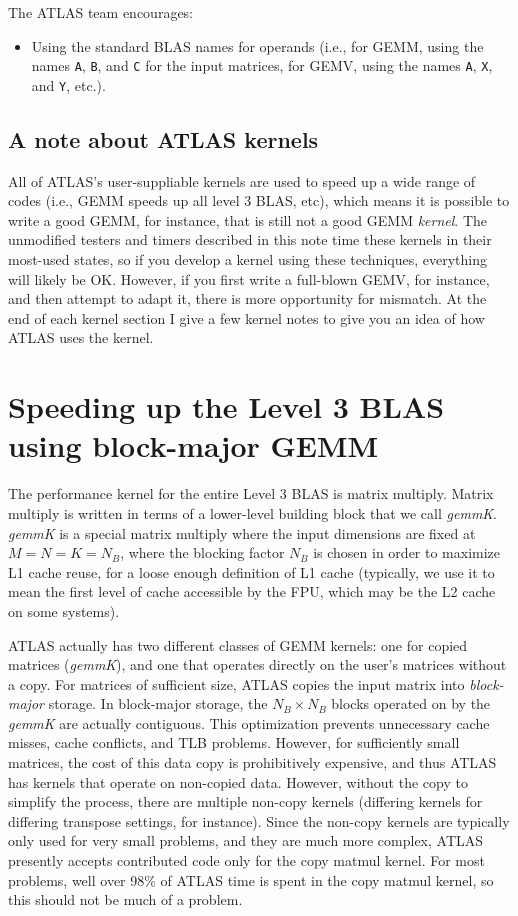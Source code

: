 \documentclass[11pt]{article}
\begin{document}
The ATLAS team encourages:
\begin{itemize}
\item Using the standard BLAS names for operands (i.e., for GEMM, using
the names {\tt A}, {\tt B}, and {\tt C} for the input matrices, for
GEMV, using the names {\tt A}, {\tt X}, and {\tt Y}, etc.).
\end{itemize}


\subsection{A note about ATLAS kernels}
All of ATLAS's user-suppliable kernels are used to speed up a wide range
of codes (i.e., GEMM speeds up all level 3 BLAS, etc), which means it is
possible to write a good GEMM, for instance, that is still not a good
GEMM {\em kernel}.  The unmodified testers and timers described in this
note time these kernels in their most-used states, so if you develop a
kernel using these techniques, everything will likely be OK.  However,
if you first write a full-blown GEMV, for instance, and then attempt
to adapt it, there is more opportunity for mismatch.  At the end of
each kernel section I give a few kernel notes to give you an idea of
how ATLAS uses the kernel.

\section{Speeding up the Level 3 BLAS using block-major GEMM}

The performance kernel for the entire Level 3 BLAS is matrix multiply.
Matrix multiply is written in terms of a lower-level building block that
we call {\it gemmK}.  {\it gemmK} is a special matrix multiply where
the input dimensions are fixed at $M = N = K = N_B$, where the blocking
factor $N_B$ is chosen in order to maximize L1 cache reuse, for a loose
enough definition of L1 cache (typically, we use it to mean the first 
level of cache accessible by the FPU, which may be the L2 cache on
some systems).

ATLAS actually has two different classes of GEMM kernels: one for copied
matrices ({\it gemmK}), and one that operates directly on the user's matrices
without a copy.  For matrices of
sufficient size, ATLAS copies the input matrix into {\em block-major} storage.
In block-major storage, the $N_B \times N_B$ blocks operated on by the
{\it gemmK} are actually contiguous.  This optimization prevents unnecessary
cache misses, cache conflicts, and TLB problems.  However, for sufficiently
small matrices, the cost of this data copy is prohibitively expensive,
and thus ATLAS has kernels that operate on non-copied data.  However,
without the copy to simplify the process, there are multiple non-copy
kernels (differing kernels for differing transpose settings, for instance).
Since the non-copy kernels are typically only used for very small problems,
and they are much more complex, ATLAS presently accepts contributed code
only for the copy matmul kernel.  For most problems, well over 98\% of ATLAS
time is spent in the copy matmul kernel, so this should not be much of 
a problem.
\end{document}
